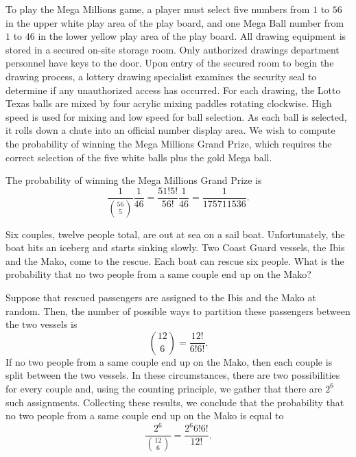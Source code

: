 \begin{example}
To play the Mega Millions game, a player must select five numbers from $1$ to $56$ in the upper white play area of the play board, and one Mega Ball number from $1$ to $46$ in the lower yellow play area of the play board.
All drawing equipment is stored in a secured on-site storage room.
Only authorized drawings department personnel have keys to the door.
Upon entry of the secured room to begin the drawing process, a lottery drawing specialist examines the security seal to determine if any unauthorized access has occurred.
For each drawing, the Lotto Texas balls are mixed by four acrylic mixing paddles rotating clockwise.
High speed is used for mixing and low speed for ball selection.
As each ball is selected, it rolls down a chute into an official number display area.
We wish to compute the probability of winning the Mega Millions Grand Prize, which requires the correct selection of the five white balls plus the gold Mega ball.

The probability of winning the Mega Millions Grand Prize is
\begin{equation*}
\frac{1}{\binom{56}{5}} \frac{1}{46}
= \frac{51!5!}{56!} \frac{1}{46}
= \frac{1}{175 711 536} .
\end{equation*}
\end{example}

\begin{example}
Six couples, twelve people total, are out at sea on a sail boat.
Unfortunately, the boat hits an iceberg and starts sinking slowly.
Two Coast Guard vessels, the Ibis and the Mako, come to the rescue.
Each boat can rescue six people.
What is the probability that no two people from a same couple end up on the Mako?

Suppose that rescued passengers are assigned to the Ibis and the Mako  at random.
Then, the number of possible ways to partition these passengers between the two vessels is
\begin{equation*}
\binom{12}{6} = \frac{12!}{6! 6!} .
\end{equation*}
If no two people from a same couple end up on the Mako, then each couple is split between the two vessels.
In these circumstances, there are two possibilities for every couple and, using the counting principle, we gather that there are $2^6$ such assignments.
Collecting these results, we conclude that the probability that no two people from a same couple end up on the Mako is equal to
\begin{equation*}
\frac{2^6}{\binom{12}{6}} = \frac{2^6 6! 6!}{12!} .
\end{equation*}
\end{example}


